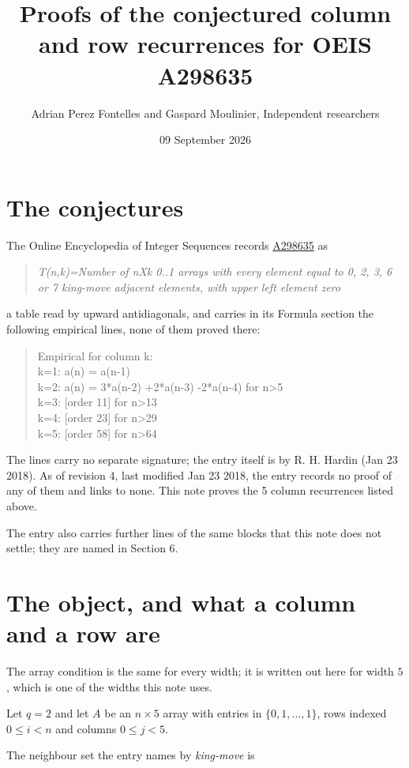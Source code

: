 \documentclass[11pt]{article}
\title{Proofs of the conjectured column and row recurrences for OEIS A298635}
\author{Adrian Perez Fontelles and Gaspard Moulinier, Independent researchers}
\date{09 September 2026}
\theoremstyle{definition}
\begin{document}
\maketitle
\section{The conjectures}

The Online Encyclopedia of Integer Sequences records \href{https://oeis.org/A298635}{A298635} as

\begin{quote}\itshape T(n,k)=Number of nXk 0..1 arrays with every element equal to 0, 2, 3, 6 or 7 king-move adjacent elements, with upper left element zero\end{quote}

a table read by upward antidiagonals, and carries in its Formula section the following empirical lines, none of them proved there:

\begin{quote}\ttfamily Empirical for column k:\\
k=1: a(n) = a(n-1)\\k=2: a(n) = 3*a(n-2) +2*a(n-3) -2*a(n-4) for n>5\\k=3: [order 11] for n>13\\k=4: [order 23] for n>29\\k=5: [order 58] for n>64\end{quote}

The lines carry no separate signature; the entry itself is by R. H. Hardin (Jan 23 2018). As of revision 4, last modified Jan 23 2018, the entry records no proof of any of them and links to none. This note proves the 5 column recurrences listed above.

The entry also carries further lines of the same blocks that this note does not settle; they are named in Section 6.

\section{The object, and what a column and a row are}

The array condition is the same for every width; it is written out here for width $5$, which is one of the widths this note uses.

Let $q = 2$ and let $A$ be an $n \times 5$ array with entries in $\{0,1,\dots,1\}$, rows indexed $0 \le i < n$ and columns $0 \le j < 5$.

The neighbour set the entry names by {\itshape king-move} is
\end{document}
